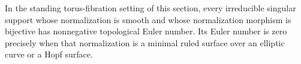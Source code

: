 
\begin{proposition}[P4R.2]\hypertarget{tag-02YD}{}\label{night:P4R.2}\label{stmt:P4R.2}


In the standing torus-fibration setting of this section, every irreducible singular support
whose normalization is smooth and whose normalization morphism
is bijective has nonnegative topological Euler number.
Its Euler number is zero precisely when that normalization is
a minimal ruled surface over an elliptic curve or a Hopf surface.
\end{proposition}

